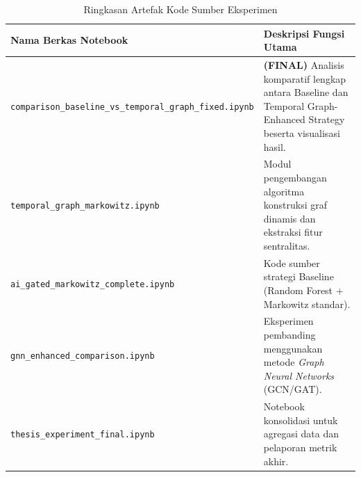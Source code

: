 \begin{table}[ht]
    \centering
    \caption{Ringkasan Artefak Kode Sumber Eksperimen}
    \label{tab:daftar_notebook}
    \renewcommand{\arraystretch}{1.3}
    \begin{tabular}{|p{5.5cm}|p{9.5cm}|}
    \hline
    \textbf{Nama Berkas Notebook} & \textbf{Deskripsi Fungsi Utama} \\ \hline
    \texttt{comparison\_baseline\_vs\newline\_temporal\_graph\_fixed.ipynb} & \textbf{(FINAL)} Analisis komparatif lengkap antara Baseline dan Temporal Graph-Enhanced Strategy beserta visualisasi hasil. \\ \hline
    \texttt{temporal\_graph\_markowitz.ipynb} & Modul pengembangan algoritma konstruksi graf dinamis dan ekstraksi fitur sentralitas. \\ \hline
    \texttt{ai\_gated\_markowitz\newline\_complete.ipynb} & Kode sumber strategi Baseline (Random Forest + Markowitz standar). \\ \hline
    \texttt{gnn\_enhanced\_comparison.ipynb} & Eksperimen pembanding menggunakan metode \textit{Graph Neural Networks} (GCN/GAT). \\ \hline
    \texttt{thesis\_experiment\_final.ipynb} & Notebook konsolidasi untuk agregasi data dan pelaporan metrik akhir. \\ \hline
    \end{tabular}
\end{table}

